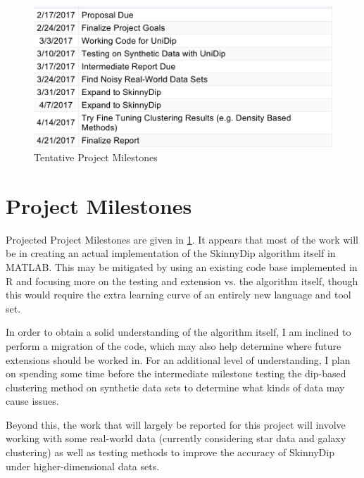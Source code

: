 \documentclass{sig-alternate-05-2015}
\begin{document}
\begin{figure}[t]
\centering
\includegraphics[width=\textwidth]{images/timeline}
\caption{Tentative Project Milestones}
\label{fig:milestones}
\end{figure}

\section{Project Milestones}
Projected Project Milestones are given in \ref{fig:milestones}. It appears that most of the work will be in creating an actual implementation of the SkinnyDip algorithm itself in MATLAB. This may be mitigated by using an existing code base implemented in R and focusing more on the testing and extension vs. the algorithm itself, though this would require the extra learning curve of an entirely new language and tool set. 

In order to obtain a solid understanding of the algorithm itself, I am inclined to perform a migration of the code, which may also help determine where future extensions should be worked in. For an additional level of understanding, I plan on spending some time before the intermediate milestone testing the dip-based clustering method on synthetic data sets to determine what kinds of data may cause issues.

Beyond this, the work that will largely be reported for this project will involve working with some real-world data (currently considering star data and galaxy clustering) as well as testing methods to improve the accuracy of SkinnyDip under higher-dimensional data sets.




\end{document}
